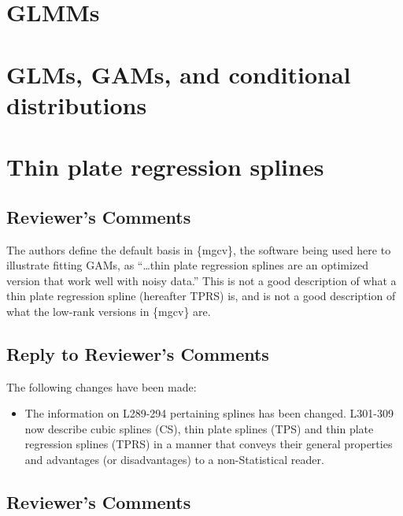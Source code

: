 \documentclass[
]{article}
\providecommand{\tightlist}{%
  \setlength{\itemsep}{0pt}\setlength{\parskip}{0pt}}
\begin{document}
\hypertarget{glmms}{%
\section{GLMMs}\label{glmms}}

\hypertarget{glms-gams-and-conditional-distributions}{%
\section{GLMs, GAMs, and conditional distributions}\label{glms-gams-and-conditional-distributions}}

\hypertarget{thin-plate-regression-splines}{%
\section{Thin plate regression splines}\label{thin-plate-regression-splines}}

\hypertarget{reviewers-comments-2}{%
\subsection{Reviewer's Comments}\label{reviewers-comments-2}}

The authors define the default basis in \{mgcv\}, the software being used here to illustrate fitting GAMs, as ``\ldots thin plate regression splines are an optimized version that work well with noisy data.'' This is not a good description of what a thin plate regression spline (hereafter TPRS) is, and is not a good description of what the low-rank versions in \{mgcv\} are.

\hypertarget{section-3}{%
\subsection{\texorpdfstring{\textcolor{reviewersblue} {Reply to Reviewer's Comments}}{}}\label{section-3}}

The following changes have been made:

\begin{itemize}
\tightlist
\item
  The information on L289-294 pertaining splines has been changed. L301-309 now describe cubic splines (CS), thin plate splines (TPS) and thin plate regression splines (TPRS) in a manner that conveys their general properties and advantages (or disadvantages) to a non-Statistical reader.
\end{itemize}

\hypertarget{reviewers-comments-3}{%
\subsection{Reviewer's Comments}\label{reviewers-comments-3}}
\end{document}
